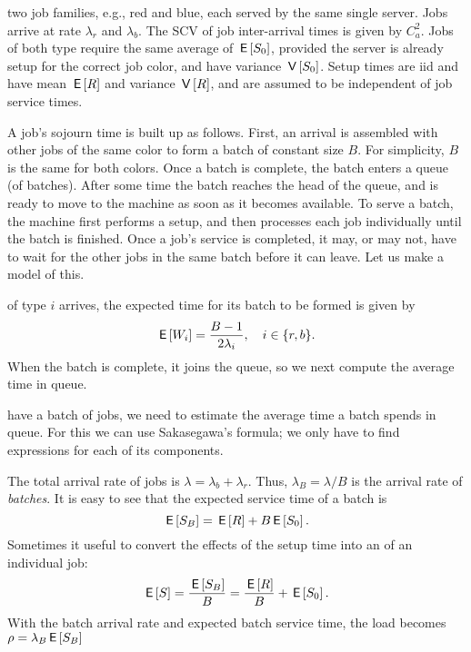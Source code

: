  two job families, e.g., red and blue, each served by the same single server.
Jobs arrive at rate $\lambda_r$ and $\lambda_b$. The SCV of job inter-arrival times is given by $C_a^2$.
Jobs of both type require the same average  of $\,\mathsf{E}\left[S_0\right]$, provided the server is already setup for the correct job color, and have variance $\,\mathsf{V}\left[S_0\right]$.
Setup times are iid and  have mean $\,\mathsf{E}\left[R\right]$ and  variance $\,\mathsf{V}\left[R\right]$, and are assumed to be independent of job service times.


A job's sojourn time is built up as follows.
First, an arrival is assembled with other jobs of the same color to form a batch of constant size $B$.
For simplicity, $B$ is the same for both colors.
Once a batch is complete, the batch enters a queue (of batches).
After some time the batch reaches the head of the queue, and is ready to move to the machine as soon as it becomes available.
To serve a batch, the machine first performs a setup, and then processes each job individually until the batch is finished.
Once a job's service is completed, it may, or may not, have to wait for the other jobs in the same batch before it can leave.
Let us make a model of this.


 of type $i$ arrives, the expected time for its batch to be formed is given by
\begin{equation}\label{eq:79}
 \,\mathsf{E}\left[W_i\right] = \frac{B-1}{2\lambda_i}, \quad i\in \{r, b\}.
\end{equation}
When the batch is complete, it joins the queue, so we next compute the average time in queue.

 have a batch of jobs, we need to estimate the average time a batch spends in queue.
For this we can use Sakasegawa's formula;  we only have to find expressions for each of its components.

The total arrival rate of jobs is $\lambda= \lambda_b+\lambda_r$. Thus, $\lambda_B=\lambda/B$ is the arrival rate of \emph{batches}.
It is easy to see that the expected service time of a batch is
\begin{equation}\label{eq:90}
\,\mathsf{E}\left[S_B\right] = \,\mathsf{E}\left[R\right] + B\,\mathsf{E}\left[S_0\right].
\end{equation}
Sometimes it useful to convert the effects of the  setup time into an  of an individual job:
\begin{equation}\label{eq:60}
  \,\mathsf{E}\left[S\right] = \frac{\,\mathsf{E}\left[S_B\right]}{B} = \frac{\,\mathsf{E}\left[R\right]} B +  \,\mathsf{E}\left[S_0\right].
 \end{equation}
With the batch arrival rate and expected batch service time, the load becomes  $\rho = \lambda_B \,\mathsf{E}\left[S_B\right]$

